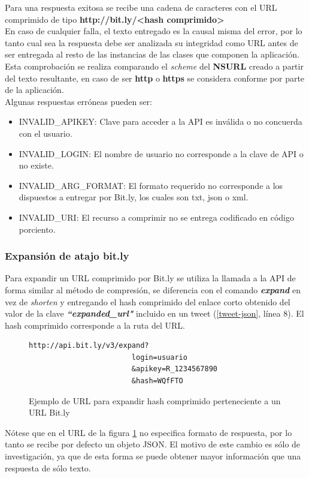 Para una respuesta exitosa se recibe una cadena de caracteres con el URL comprimido de tipo 
\textbf{http://bit.ly/\textless hash comprimido\textgreater} \\

En caso de cualquier falla, el texto entregado es la causal misma del error, por lo tanto cual sea la respuesta debe ser analizada su integridad como URL antes de ser entregada al resto de las instancias de las clases que componen la aplicación. Esta comprobación se realiza comparando el \textit{scheme} del \textbf{NSURL} creado a partir del texto resultante, en caso de ser \textbf{http} o \textbf{https} se considera conforme por parte de la aplicación.\\ 

Algunas respuestas erróneas pueden ser:
\begin{itemize}
\item INVALID\_APIKEY: Clave para acceder a la API es inválida o no concuerda con el usuario. 
\item INVALID\_LOGIN: El nombre de usuario no corresponde a la clave de API o no existe.
\item INVALID\_ARG\_FORMAT: El formato requerido no corresponde a los dispuestos a entregar por Bit.ly, los cuales son txt, json o xml.
\item INVALID\_URI: El recurso a comprimir no se entrega codificado en código porciento\cite{percent-encoding}.
\end{itemize}

		\subsubsection{Expansión de atajo bit.ly}
Para expandir un URL comprimido por Bit.ly se utiliza la llamada a la API de forma similar al método de compresión, se diferencia con el comando \textit{\textbf{expand}} en vez de \textit{shorten} y entregando el hash comprimido del enlace corto obtenido del valor de la clave \textit{\textbf{\textquotedblleft expanded\_url"}} incluido en un tweet (\ref{tweet-json}, línea 8). El hash comprimido corresponde a la ruta del URL.

\begin{figure}[H]
	\centering
\begin{lstlisting}
http://api.bit.ly/v3/expand?
						login=usuario
						&apikey=R_1234567890
						&hash=WQfFTO
\end{lstlisting}
	\caption{Ejemplo de URL para expandir hash comprimido perteneciente a un URL Bit.ly}
	\label{bitly-expand}
\end{figure}	
Nótese que en el URL de la figura \ref{bitly-expand} no especifica formato de respuesta, por lo tanto se recibe por defecto un objeto JSON. El motivo de este cambio es sólo de investigación, ya que de esta forma se puede obtener mayor información que una respuesta de sólo texto.

